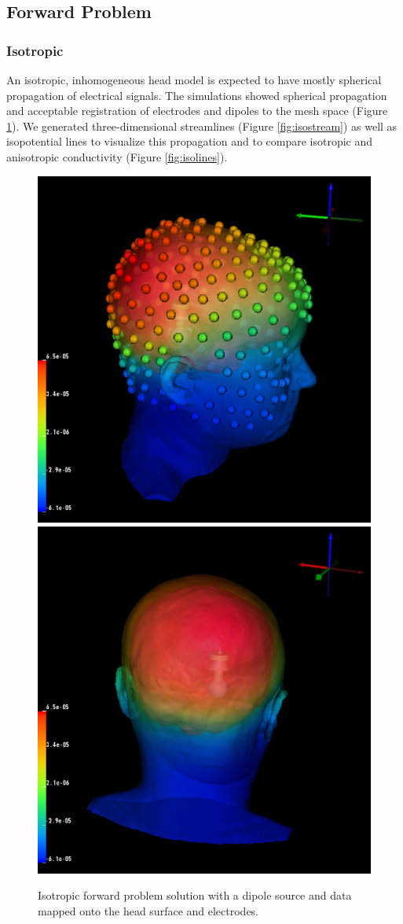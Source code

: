 \subsection{Forward Problem}

\subsubsection{Isotropic}

An isotropic, inhomogeneous head model is expected to have mostly spherical propagation of electrical signals. The simulations showed spherical propagation and acceptable registration of electrodes and dipoles to the mesh space (Figure \ref{fig:isodip}). We generated three-dimensional streamlines (Figure \ref{fig:isostream}) as well as isopotential lines to visualize this propagation and to compare isotropic and anisotropic conductivity (Figure \ref{fig:isolines}). 

\begin{figure}[H]
\begin{center}
\includegraphics[width=.49\textwidth]{Figures/iso_dipole}
\includegraphics[width=.49\textwidth]{Figures/iso_dipole_2}
\caption{Isotropic forward problem solution with a dipole source and data mapped onto the head surface and electrodes.}
\label{fig:isodip}
\end{center}
\end{figure}

